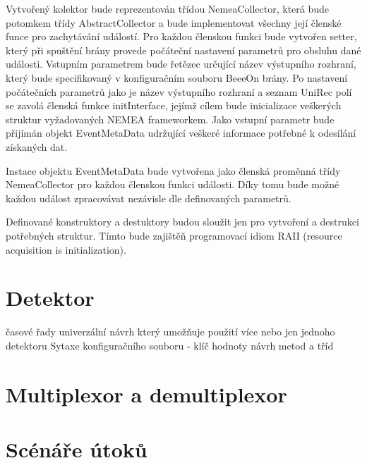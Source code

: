  Vytvořený kolektor bude reprezentován třídou NemeaCollector, která bude potomkem třídy
 AbstractCollector a bude implementovat všechny její členské funce pro zachytávání událostí. Pro každou 
 členskou funkci  bude vytvořen setter, který při spuštění brány provede počáteční nastavení
 parametrů pro obsluhu dané 
 události. Vstupním parametrem bude řetězec určující název výstupního rozhraní, který bude
 specifikovaný v 
 konfiguračním souboru BeeeOn brány. Po nastavení počátečních parametrů jako je název výstupního
 rozhraní a seznam UniRec polí se zavolá členská funkce initInterface, jejímž cílem bude inicializace
 veškerých struktur vyžadovaných NEMEA frameworkem.
 Jako vstupní parametr bude přijímán objekt EventMetaData udržující veškeré informace potřebné 
 k odesílání získaných dat.
 
 Instace objektu EventMetaData bude vytvořena jako členská proměnná třídy NemeaCollector
 pro každou členskou funkci události. Díky tomu bude možné každou událost zpracovávat nezávisle dle
 definovaných parametrů.
 
 Definované konstruktory a destuktory budou sloužit jen pro vytvoření a destrukci potřebných 
 struktur. Tímto bude zajištěň programovací idiom RAII (resource acquisition is initialization).
    
 \section{Detektor}
  časové řady
  univerzální návrh který umožňuje použití více nebo jen jednoho detektoru
  Sytaxe konfiguračního souboru - klíč hodnoty
  návrh metod a tříd 
  
 \section{Multiplexor a demultiplexor}
 
 \section{Scénáře útoků}
